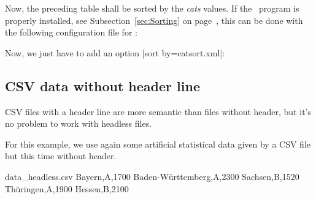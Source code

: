 \documentclass[a4paper,11pt]{ltxdoc}
\begin{document}
\begin{dispExample}
\end{dispExample}




\clearpage
Now, the preceding table shall be sorted by the \emph{cats} values.
If the \csvsorter\ program is properly installed,
see Subsection~\ref{sec:Sorting} on page~\pageref{sec:Sorting},
this can be done with the following configuration file for \csvsorter:


Now, we just have to add an option |sort by=catsort.xml|:
\begin{dispExample}
\end{dispExample}


\clearpage
\subsection{CSV data without header line}\label{noheader}%
CSV files with a header line are more semantic than files without header,
but it's no problem to work with headless files.

For this example, we use again some artificial statistical data given by a CSV file
but this time without header.

\begin{tcbverbatimwrite}{data_headless.csv}
Bayern,A,1700
Baden-Württemberg,A,2300
Sachsen,B,1520
Thüringen,A,1900
Hessen,B,2100
\end{tcbverbatimwrite}
\end{document}

